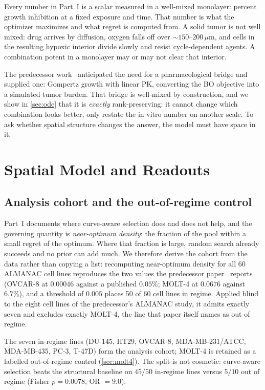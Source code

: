 \documentclass{article}
\begin{document}
Every number in Part~I is a scalar measured in a well-mixed monolayer:
percent growth inhibition at a fixed exposure and time. That number is what
the optimizer maximizes and what regret is computed from. A solid tumor is
not well mixed: drug arrives by diffusion, oxygen falls off over
${\sim}150$--$200\,\mu$m, and cells in the resulting hypoxic interior divide
slowly and resist cycle-dependent agents. A combination potent in a monolayer
may or may not clear that interior.

The predecessor work~\citep{gonehal2026savitar} anticipated the need for a pharmacological bridge and
supplied one: Gompertz growth with linear PK, converting the BO objective
into a simulated tumor burden. That bridge is well-mixed by construction, and
we show in \cref{sec:ode} that it is \emph{exactly} rank-preserving: it
cannot change which combination looks better, only restate the in vitro
number on another scale. To ask whether spatial structure changes the answer,
the model must have space in it.

\section{Spatial Model and Readouts}

\subsection{Analysis cohort and the out-of-regime control}
\label{sec:cohort}

Part~I documents where curve-aware selection does and does not help, and the
governing quantity is \emph{near-optimum density}: the fraction of the pool
within a small regret of the optimum. Where that fraction is large, random
search already succeeds and no prior can add much. We therefore derive the
cohort from the data rather than copying a list: recomputing near-optimum
density for all 60 ALMANAC cell lines reproduces the two values the
predecessor paper~\citep{gonehal2026savitar} reports (OVCAR-8 at $0.00046$ against a published $0.05\%$;
MOLT-4 at $0.0676$ against $6.7\%$), and a threshold of $0.005$ places 50 of
60 cell lines in regime. Applied blind to the eight cell lines of the
predecessor's ALMANAC study, it admits exactly seven and excludes exactly
MOLT-4, the line that paper itself names as out of regime.

The seven in-regime lines (DU-145, HT29, OVCAR-8, MDA-MB-231/ATCC,
MDA-MB-435, PC-3, T-47D) form the analysis cohort; MOLT-4 is retained as a
labelled out-of-regime control (\cref{sec:molt4}). The split is not
cosmetic: curve-aware selection beats the structural baseline on $45/50$
in-regime lines versus $5/10$ out of regime (Fisher $p = 0.0078$,
OR $= 9.0$).
\end{document}
